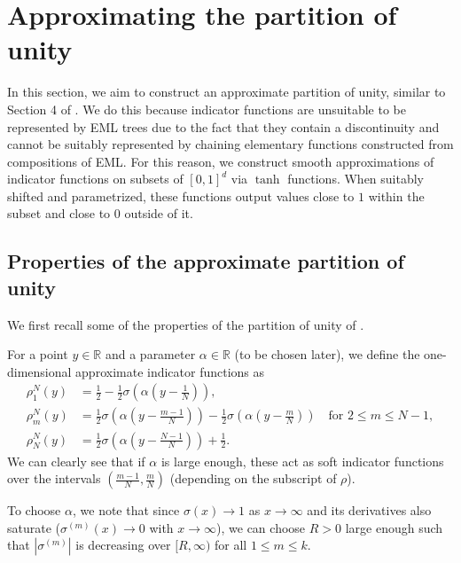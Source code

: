 \documentclass{article}
\newcommand{\fr}{\frac}
\newcommand{\be}{\begin{equation}}
\newcommand{\ee}{\end{equation}}
\newcommand{\s}{\sigma}
\numberwithin{Def}{section}
\newcommand{\R}{\mathbb R}
\begin{document}
\section{Approximating the partition of unity}
In this section, we aim to construct an approximate partition of unity, similar to Section 4 of \cite{de2021approximation}. We do this because indicator functions are unsuitable to be represented by EML trees due to the fact that they contain a discontinuity and cannot be suitably represented by chaining elementary functions constructed from compositions of EML. 
For this reason, we construct smooth approximations of indicator functions on subsets of $[0,1]^d$ via $\tanh$ functions. When suitably shifted and parametrized, these functions output values close to $1$ within the subset and close to $0$ outside of it.

\subsection{Properties of the approximate partition of unity}
We first recall some of the properties of the partition of unity of \cite{de2021approximation}.

For a point $y \in \R$ and a parameter $\alpha \in \R$ (to be chosen later), we define the one-dimensional approximate indicator functions as
\be\begin{aligned}
\label{partitions_numero_uno}
    \rho_1^N(y) &= \fr{1}{2} - \fr{1}{2} \s \left( \alpha \left( y - \fr{1}{N} \right) \right), \\
    \rho_m^N(y) &= \fr{1}{2} \s \left( \alpha \left( y - \fr{m-1}{N} \right) \right)  - \fr{1}{2} \s \left( \alpha \left(y - \fr{m}{N} \right) \right) \quad \text{for } 2 \leq m \leq N-1, \\
    \rho_N^N(y) &= \fr{1}{2} \s \left( \alpha \left( y - \fr{N-1}{N} \right) \right) + \fr{1}{2}.
\end{aligned}\ee
We can clearly see that if $\alpha$ is large enough, these act as soft indicator functions over the intervals $\left(\fr{m-1}{N}, \fr{m}{N} \right)$ (depending on the subscript of $\rho$). 

To choose $\alpha$, we note that since $\s (x) \to 1$ as $x \to \infty$ and its derivatives also saturate ($\s^{(m)}(x) \to 0$ with $x \to \infty$), we can choose $R > 0$ large enough such that $|\s^{(m)}|$ is decreasing over $[R,\infty)$ for all $1 \leq m \leq k$.
\end{document}
